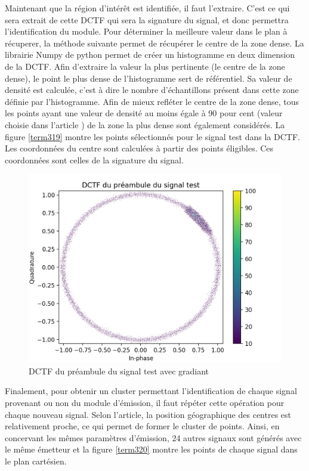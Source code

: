 \vspace{0.1cm}

Maintenant que la région d'intérêt est identifiée, il faut l'extraire. C'est ce qui sera extrait de cette \ac{DCTF} qui sera la signature du signal, et donc permettra l'identification du module. Pour déterminer la meilleure valeur dans le plan à récuperer, la méthode suivante permet de récupérer le centre de la zone dense. La librairie Numpy de python permet de créer un histogramme en deux dimension de la \ac{DCTF}. Afin d'extraire la valeur la plus pertinente (le centre de la zone dense), le point le plus dense de l'histogramme sert de référentiel. Sa valeur de densité est calculée, c'est à dire le nombre d'échantillons présent dans cette zone définie par l'histogramme. Afin de mieux refléter le centre de la zone dense, tous les points ayant une valeur de densité au moins égale à 90 pour cent (valeur choisie dans l'article \cite{loraDCTF}) de la zone la plus dense sont également considérés. La figure \ref{term319} montre les points sélectionnés pour le signal test dans la \ac{DCTF}. Les coordonnées du centre sont calculées à partir des points éligibles. Ces coordonnées sont celles de la signature du signal. 

\begin{figure}[h]
\centering

\includegraphics[scale=0.3]{images/dctf5.png}
\caption{DCTF du préambule du signal test avec gradiant}\label{term318}
\end{figure}

Finalement, pour obtenir un cluster permettant l'identification de chaque signal provenant ou non du module d'émission, il faut répéter cette opération pour chaque nouveau signal. Selon l'article, la position géographique des centres est relativement proche, ce qui permet de former le cluster de points. Ainsi, en concervant les mêmes paramètres d'émission, 24 autres signaux sont générés avec le même émetteur et la figure \ref{term320} montre les points de chaque signal dans le plan cartésien.

